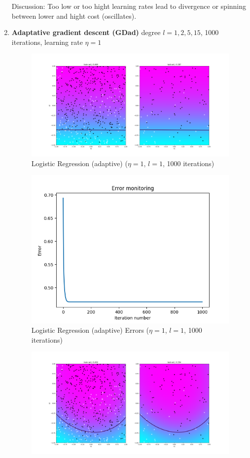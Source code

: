 \documentclass[12pt,halfline,a4paper]{ouparticle}
\begin{document}
\begin{enumerate}
	Discussion: Too low or too hight learning rates lead to divergence or spinning
	between lower and hight cost (oscillates).
	\item \textbf{Adaptative gradient descent (GDad)} degree $l
	= 1, 2, 5, 15$, 1000 iterations, learning rate $\eta = 1$
	\begin{figure}[H]
  	\centering
	        \includegraphics[width=\textwidth]{figures/logreg_adapt_1.png}
	    \caption{Logistic Regression (adaptive) ($\eta = 1$, $l = 1$, 1000
	    iterations)}
	\end{figure}
	\begin{figure}[H]
  	\centering
	        \includegraphics[width=\textwidth]{figures/logreg_adapt_1_error.png}
	    \caption{Logistic Regression (adaptive) Errors ($\eta = 1$, $l = 1$, 1000
	    iterations)}
	\end{figure}
	\begin{figure}[H]
  	\centering
	        \includegraphics[width=\textwidth]{figures/logreg_adapt_2.png}

\end{figure}
\end{enumerate}
\end{document}
